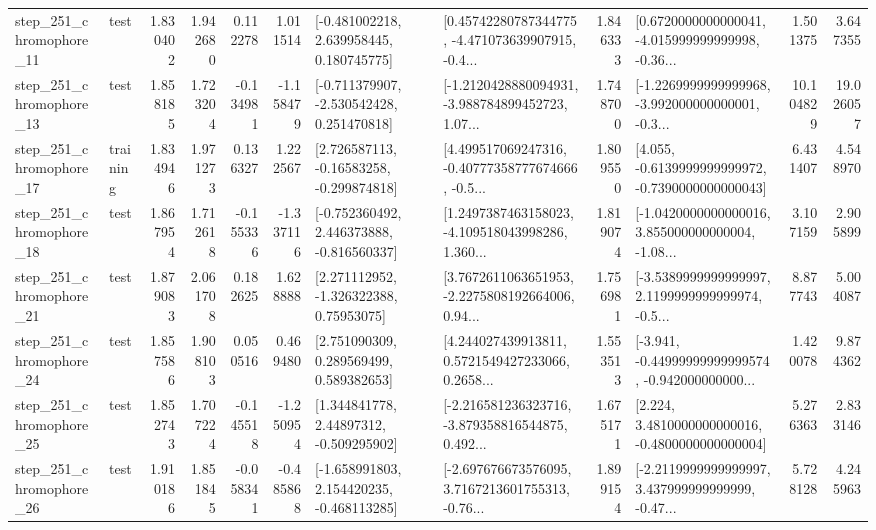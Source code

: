 \begin{tabular}{llrrrrllrlrr}
  step\_251\_chromophore\_11 &      test &      1.830402 &    1.942680 &      0.112278 &  1.011514 &    [-0.481002218, 2.639958445, 0.180745775] &  [0.45742280787344775, -4.471073639907915, -0.4... &       1.846333 &  [0.6720000000000041, -4.015999999999998, -0.36... &            1.501375 &          3.647355 \\
  step\_251\_chromophore\_13 &      test &      1.858185 &    1.723204 &     -0.134981 & -1.158479 &   [-0.711379907, -2.530542428, 0.251470818] &  [-1.2120428880094931, -3.988784899452723, 1.07... &       1.748700 &  [-1.2269999999999968, -3.992000000000001, -0.3... &           10.104829 &         19.026057 \\
  step\_251\_chromophore\_17 &  training &      1.834946 &    1.971273 &      0.136327 &  1.222567 &    [2.726587113, -0.16583258, -0.299874818] &  [4.499517069247316, -0.40777358777674666, -0.5... &       1.809550 &  [4.055, -0.6139999999999972, -0.7390000000000043] &            6.431407 &          4.548970 \\
  step\_251\_chromophore\_18 &      test &      1.867954 &    1.712618 &     -0.155336 & -1.337116 &   [-0.752360492, 2.446373888, -0.816560337] &  [1.2497387463158023, -4.109518043998286, 1.360... &       1.819074 &  [-1.0420000000000016, 3.855000000000004, -1.08... &            3.107159 &          2.905899 \\
  step\_251\_chromophore\_21 &      test &      1.879083 &    2.061708 &      0.182625 &  1.628888 &     [2.271112952, -1.326322388, 0.75953075] &  [3.7672611063651953, -2.2275808192664006, 0.94... &       1.756981 &  [-3.5389999999999997, 2.1199999999999974, -0.5... &            8.877743 &          5.004087 \\
  step\_251\_chromophore\_24 &      test &      1.857586 &    1.908103 &      0.050516 &  0.469480 &     [2.751090309, 0.289569499, 0.589382653] &  [4.244027439913811, 0.5721549427233066, 0.2658... &       1.553513 &  [-3.941, -0.44999999999999574, -0.942000000000... &            1.420078 &          9.874362 \\
  step\_251\_chromophore\_25 &      test &      1.852743 &    1.707224 &     -0.145518 & -1.250954 &     [1.344841778, 2.44897312, -0.509295902] &  [-2.216581236323716, -3.879358816544875, 0.492... &       1.675171 &   [2.224, 3.4810000000000016, -0.4800000000000004] &            5.276363 &          2.833146 \\
  step\_251\_chromophore\_26 &      test &      1.910186 &    1.851845 &     -0.058341 & -0.485868 &   [-1.658991803, 2.154420235, -0.468113285] &  [-2.697676673576095, 3.7167213601755313, -0.76... &       1.899154 &  [-2.2119999999999997, 3.437999999999999, -0.47... &            5.728128 &          4.245963 \\

\end{tabular}
